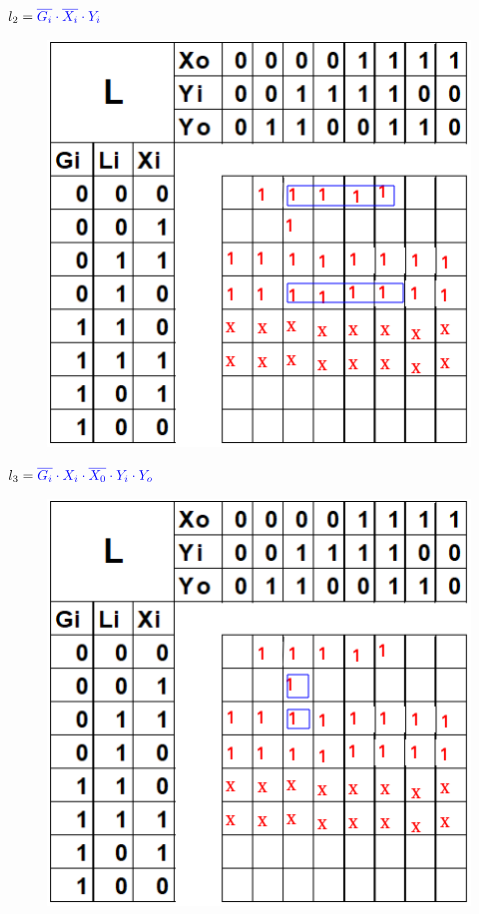 \documentclass[12pt,letterpaper]{book}
\begin{document}
\begin{multicols}{2}
$l_2=\textcolor{blue}{\overline{G_i} \cdot \overline{X_i} \cdot Y_i}$

\begin{figure}[H]
\centering
\includegraphics[width=1\linewidth]{figures/k8.png}
\caption{}
\label{k8}
\end{figure}
\vspace{0.2cm}

$l_3=\textcolor{blue}{ \overline{G_i} \cdot X_i \cdot \overline{X_0} \cdot Y_i \cdot Y_o}$

\begin{figure}[H]
\centering
\includegraphics[width=1\linewidth]{figures/k9.png}
\caption{}
\label{k9}
\end{figure}
\vspace{0.2cm}


\end{multicols}
\end{document}
